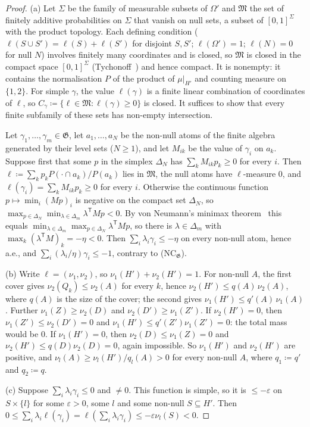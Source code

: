\documentclass[11pt]{article}
\theoremstyle{definition}\newtheorem{definition}[theorem]{Definition}
\theoremstyle{remark}\newtheorem{remark}[theorem]{Remark}
\begin{document}
\begin{proof}
(a) Let $\Sigma$ be the family of measurable subsets of $\Omega'$ and
$\mathfrak M$ the set of finitely additive probabilities on $\Sigma$ that
vanish on null sets, a subset of $[0,1]^\Sigma$ with the product topology.
Each defining condition ($\ell(S\cup S')=\ell(S)+\ell(S')$ for disjoint $S,
S'$; $\ell(\Omega')=1$; $\ell(N)=0$ for null $N$) involves finitely many
coordinates and is closed, so $\mathfrak M$ is closed in the compact space
$[0,1]^\Sigma$ (Tychonoff~\cite{Tychonoff}) and hence compact. It is
nonempty: it contains the normalisation $P$ of the product of
$\mu|_{H'}$ and counting measure on $\{1,2\}$. For simple $\gamma$, the
value $\ell(\gamma)$ is a finite linear combination of coordinates of
$\ell$, so $C_\gamma\coloneqq\{\ell\in\mathfrak M:\ell(\gamma)\ge0\}$ is
closed. It suffices to show that every finite subfamily of these sets has
non-empty intersection.

Let $\gamma_1,\dots,\gamma_m\in\mathfrak G$, let $a_1,\dots,a_N$ be the
non-null atoms of the finite algebra generated by their level sets ($N\ge1$),
and let $M_{ik}$ be the value of $\gamma_i$ on $a_k$. Suppose first that
some $p$ in the simplex $\Delta_N$ has $\sum_kM_{ik}p_k\ge0$ for every $i$.
Then $\ell\coloneqq\sum_kp_kP(\cdot\cap a_k)/P(a_k)$ lies in $\mathfrak M$,
the null atoms have $\ell$-measure $0$, and
$\ell(\gamma_i)=\sum_kM_{ik}p_k\ge0$ for every $i$. Otherwise the continuous
function $p\mapsto\min_i(Mp)_i$ is negative on the compact set $\Delta_N$,
so $\max_{p\in\Delta_N}\min_{\lambda\in\Delta_m}\lambda^{\mathsf T}Mp<0$.
By von Neumann's minimax theorem~\cite{vN} this equals
$\min_{\lambda\in\Delta_m}\max_{p\in\Delta_N}\lambda^{\mathsf T}Mp$, so
there is $\lambda\in\Delta_m$ with $\max_k(\lambda^{\mathsf T}M)_k=-\eta<0$.
Then $\sum_i\lambda_i\gamma_i\le-\eta$ on every non-null atom, hence a.e.,
and $\sum_i(\lambda_i/\eta)\gamma_i\le-1$, contrary to (NC$_{\mathfrak G}$).

(b) Write $\ell=(\nu_1,\nu_2)$, so $\nu_1(H')+\nu_2(H')=1$. For non-null $A$,
the first cover gives $\nu_2(Q_k)\le\nu_2(A)$ for every $k$, hence
$\nu_2(H')\le q(A)\,\nu_2(A)$, where $q(A)$ is the size of the cover; the
second gives $\nu_1(H')\le q'(A)\,\nu_1(A)$. Further $\nu_1(Z)\ge\nu_2(D)$
and $\nu_2(D')\ge\nu_1(Z')$. If $\nu_2(H')=0$, then $\nu_1(Z')\le
\nu_2(D')=0$ and $\nu_1(H')\le q'(Z')\nu_1(Z')=0$: the total mass would be
$0$. If $\nu_1(H')=0$, then $\nu_2(D)\le\nu_1(Z)=0$ and
$\nu_2(H')\le q(D)\nu_2(D)=0$, again impossible. So $\nu_1(H')$ and
$\nu_2(H')$ are positive, and $\nu_l(A)\ge\nu_l(H')/q_l(A)>0$ for every
non-null $A$, where $q_1\coloneqq q'$ and $q_2\coloneqq q$.

(c) Suppose $\sum_i\lambda_i\gamma_i\le0$ and $\ne0$. This function is
simple, so it is $\le-\varepsilon$ on $S\times\{l\}$ for some $\varepsilon>0$,
some $l$ and some non-null $S\subseteq H'$. Then $0\le\sum_i\lambda_i
\ell(\gamma_i)=\ell(\sum_i\lambda_i\gamma_i)\le-\varepsilon\nu_l(S)<0$.
\end{proof}
\end{document}
